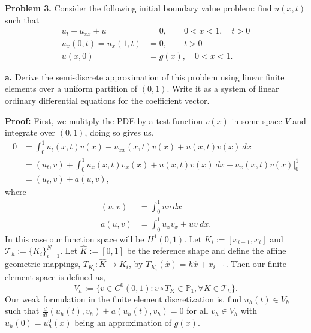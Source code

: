 \documentclass[11pt]{article}
\begin{document}
\vskip 2cm



\textbf{Problem 3.}  Consider the following initial boundary value problem: find $u(x,t)$ such that 
\begin{align}
    u_t - u_{xx} + u &= 0, \qquad 0 < x < 1, \quad t > 0 \\
    u_x(0,t) = u_x(1,t) &= 0, \qquad t > 0 \\
    u(x,0) &= g(x), \quad 0 < x < 1.
\end{align}

\vskip 1cm


\textbf{a.} Derive the semi-discrete approximation of this problem using linear finite elements over a uniform partition of $(0,1)$.  
Write it as a system of linear ordinary differential equations for the coefficient vector.


\vskip 1cm


\textbf{Proof:} First, we mulitply the PDE by a test function $v(x)$ in some space $V$ and integrate over $(0,1)$, doing so gives us,
\begin{align*}
    0 &= \int_0^1 u_t(x,t) v(x) - u_{xx}(x,t) v(x) + u(x,t) v(x) \: dx \\
    &= (u_t, v) + \int_0^1 u_x(x,t) v_x(x)  + u(x,t) v(x) \: dx - u_x(x,t) v(x) \Big|_0^1 \\
    &= (u_t,v) + a(u,v),
\end{align*}
where 
\begin{align*}
    (u,v) &= \int_0^1 u v \: dx \\
    a(u,v) &= \int_0^1 u_x v_x + uv \: dx.
\end{align*}
In this case our function space will be $H^1(0,1)$.
Let $K_i := [x_{i-1}, x_i]$ and $\mathcal{T}_h := \{ K_i \}_{i=1}^N$.
Let $\widehat{K} := [0,1]$ be the reference shape and define the affine geometric mappings, $T_{K_i} : \widehat{K} \to K_i$, by $T_{K_i}(\hat{x}) = h\hat{x} + x_{i-1}$.
Then our finite element space is defined as,
\begin{equation*}
	V_h := \{ v \in C^0(0,1) : v \circ T_K \in \mathbb{P}_1, \forall K \in \mathcal{T}_h \}.
\end{equation*}
Our weak formulation in the finite element discretization is, find $u_h(t) \in V_h$ such that $\frac{d}{dt}(u_h(t), v_h) + a(u_h(t), v_h) = 0$ for all $v_h \in V_h$ with $u_h(0) = u^0_h(x)$ being an approximation of $g(x)$.
\end{document}
